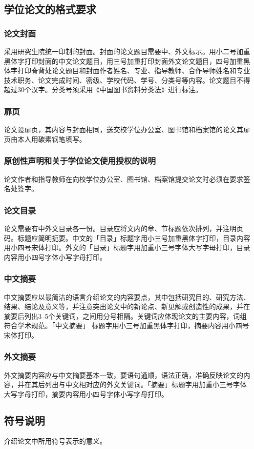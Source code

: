 \documentclass[openany]{sduthesis} %
\begin{document}
\subsection{学位论文的格式要求}
\subsubsection{论文封面}
采用研究生院统一印制的封面。封面的论文题目需要中、外文标示。用小二号加重黑体字打印封面的中文论文题目，用三号加重打印封面外文论文题目，四号加重黑体字打印脊背处论文题目和封面作者姓名、专业、指导教师、合作导师姓名和专业技术职务、论文完成时间、密级、学校代码、学号、分类号等内容。论文题目不得超过30个汉字。分类号须采用《中国图书资料分类法》进行标注。
\subsubsection{扉页}
论文设扉页，其内容与封面相同，送交校学位办公室、图书馆和档案馆的论文其扉页由本人用碳素钢笔填写。
\subsubsection{原创性声明和关于学位论文使用授权的说明}
论文作者和指导教师在向校学位办公室、图书馆、档案馆提交论文时必须在要求签名处签字。
\subsubsection{论文目录}
论文需要有中外文目录各一份。目录应将文内的章、节标题依次排列，并注明页码。标题应简明扼要。中文的「目录」标题字用小三号加重黑体字打印，目录内容用小四号宋体打印。外文的「目录」标题字用加重小三号字体大写字母打印，目录内容用小四号字体小写字母打印。
\subsubsection{中文摘要}
中文摘要应以最简洁的语言介绍论文的内容要点，其中包括研究目的、研究方法、结果、结论及意义等，并注意突出论文中的新论点、新见解或创造性的成果，并在摘要后列出3--5个关键词，之间用分号相隔。关键词应体现论文的主要内容，词组符合学术规范。「中文摘要」 标题字用小三号加重黑体字打印，摘要内容用小四号宋体打印。
\subsubsection{外文摘要}
外文摘要内容应与中文摘要基本一致，要语句通顺，语法正确，准确反映论文的内容，并在其后列出与中文相对应的外文关键词。「摘要」标题字用加重小三号字体大写字母打印，摘要内容用小四号字体小写字母打印。
\subsection{符号说明}
介绍论文中所用符号表示的意义。
\end{document}
